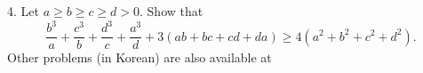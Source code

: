 4. Let $a \geq b \geq c \geq d>0$. Show that
\[
\frac{b^3}{a} + \frac{c^3}{b} + \frac{d^3}{c} + \frac{a^3}{d} + 3 \left( ab+bc+cd+da \right) \geq 
4 {\left( a^2 + b^2 + c^2 +d^2 \right)}.
\]Other problems (in Korean) are also available at 